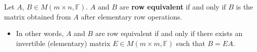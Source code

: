 \documentclass[letterpaper,12pt]{article}
\begin{document}
\begin{definition}
Let $A$, $B \in M(m \times n, \mathbb{F})$. $A$ and $B$ are \textbf{row equivalent} if and only if $B$ is the matrix obtained from $A$ after elementary row operations.
\begin{itemize}
    \item In other words, $A$ and $B$ are row equivalent if and only if there exists an invertible (elementary) matrix $E \in M(m \times m, \mathbb{F})$ such that $B = EA$.
\end{itemize}
\end{definition}
\end{document}
